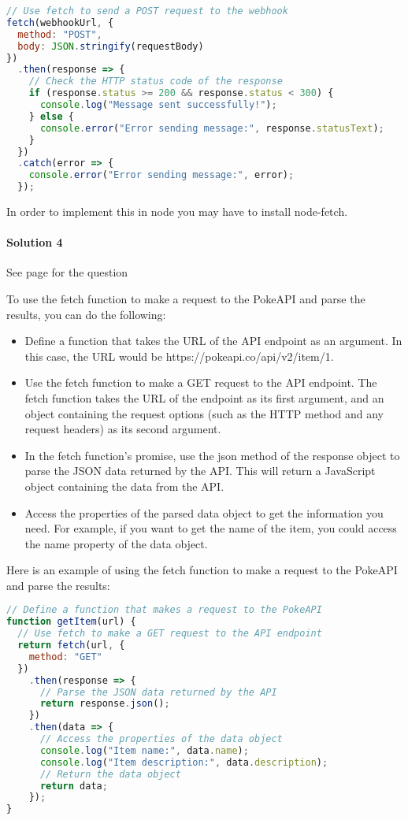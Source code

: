 {\begin{itemize}
\begin{lstlisting}[language=Javascript, caption=Post to webhook url using fetch]
// Use fetch to send a POST request to the webhook
fetch(webhookUrl, {
  method: "POST",
  body: JSON.stringify(requestBody)
})
  .then(response => {
    // Check the HTTP status code of the response
    if (response.status >= 200 && response.status < 300) {
      console.log("Message sent successfully!");
    } else {
      console.error("Error sending message:", response.statusText);
    }
  })
  .catch(error => {
    console.error("Error sending message:", error);
  });

\end{lstlisting}

In order to implement this in node you may have to install node-fetch.
\end{itemize}

\label{sol:4}
\paragraph{Solution 4}

See page \pageref{ex:4} for the question

To use the fetch function to make a request to the PokeAPI and parse the results, you can do the following:

\begin{itemize}
\item Define a function that takes the URL of the API endpoint as an argument. In this case, the URL would be https://pokeapi.co/api/v2/item/1.

\item Use the fetch function to make a GET request to the API endpoint. The fetch function takes the URL of the endpoint as its first argument, and an object containing the request options (such as the HTTP method and any request headers) as its second argument.

\item In the fetch function's promise, use the json method of the response object to parse the JSON data returned by the API. This will return a JavaScript object containing the data from the API.

\item Access the properties of the parsed data object to get the information you need. For example, if you want to get the name of the item, you could access the name property of the data object.
\end{itemize}
Here is an example of using the fetch function to make a request to the PokeAPI and parse the results:
\begin{lstlisting}[language=Javascript, caption=Fetch data from Pokeapi]
// Define a function that makes a request to the PokeAPI
function getItem(url) {
  // Use fetch to make a GET request to the API endpoint
  return fetch(url, {
    method: "GET"
  })
    .then(response => {
      // Parse the JSON data returned by the API
      return response.json();
    })
    .then(data => {
      // Access the properties of the data object
      console.log("Item name:", data.name);
      console.log("Item description:", data.description);
      // Return the data object
      return data;
    });
}


\end{lstlisting}}
